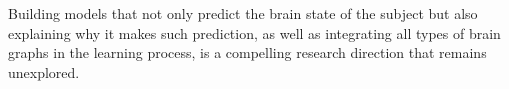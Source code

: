 Building models that not only
predict the brain state of the subject but also explaining why
it makes such prediction, as well as integrating all types
of brain graphs in the learning process, is a compelling
research direction that remains unexplored.

\cite{Bessadok2022}